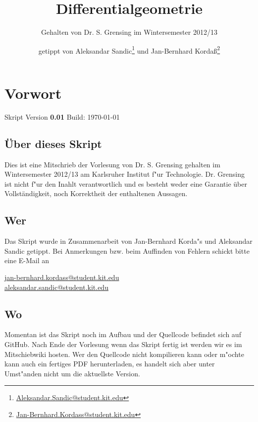 \documentclass[paper=A4, twoside, chapterprefix=true, bibliography=totoc, headsepline]{scrbook}
\title{Differentialgeometrie}
\subtitle{Gehalten von Dr. S. Grensing im Wintersemester 2012/13}
\author{getippt von Aleksandar Sandic\thanks{\href{mailto:aleksandar.sandic@student.kit.edu}{Aleksandar.Sandic@student.kit.edu}} und Jan-Bernhard Korda\ss\thanks{\href{mailto:jan-bernhard.kordass@student.kit.edu}{Jan-Bernhard.Kordass@student.kit.edu}}}
\begin{document}

\maketitle

\setlength\parskip{0.6pt}
\tableofcontents

\chapter*{Vorwort}
\setlength\parskip{\smallskipamount}
Skript Version \textbf{0.01} \quad Build: \today

\section*{\"Uber dieses Skript}
Dies ist eine Mitschrieb der Vorlesung  von Dr. S. Grensing gehalten im Wintersemester 2012/13 am Karlsruher Institut f"ur Technologie. Dr. Grensing ist nicht f"ur den Inahlt verantwortlich und es besteht weder eine Garantie über Vollständigkeit, noch Korrektheit der enthaltenen Aussagen.

\section*{Wer}
Das Skript wurde in Zusammenarbeit von Jan-Bernhard Korda"s und Aleksandar Sandic getippt. Bei Anmerkungen bzw. beim Auffinden von Fehlern schickt bitte eine E-Mail an
\begin{center}
  \href{mailto:jan-bernhard.kordass@student.kit.edu}{jan-bernhard.kordass@student.kit.edu}\\
  \href{mailto:aleksandar.sandic@student.kit.edu}{aleksandar.sandic@student.kit.edu}
\end{center}

\section*{Wo}
Momentan ist das Skript noch im Aufbau und der Quellcode befindet sich auf GitHub. Nach Ende der Vorlesung wenn das Skript fertig ist werden wir es im Mitschiebwiki hosten. Wer den Quellcode nicht kompilieren kann oder m"ochte kann auch ein fertiges PDF herunterladen, es handelt sich aber unter Umst"anden nicht um die aktuellste Version.
\end{document}
